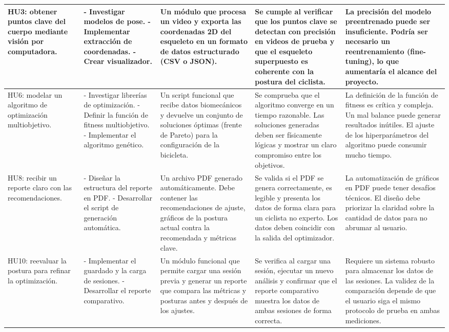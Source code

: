 \documentclass[
11pt, %
]{charter}
\begin{document}
\begin{xltabular}{\linewidth}{| X | X | X | X | X |}
HU3: obtener puntos clave del cuerpo mediante visión por computadora.
 & - Investigar modelos de pose. \newline - Implementar extracción de coordenadas. \newline - Crear visualizador.
 & Un módulo que procesa un video y exporta las coordenadas 2D del esqueleto en un formato de datos estructurado (CSV o JSON).
 & Se cumple al verificar que los puntos clave se detectan con precisión en videos de prueba y que el esqueleto superpuesto es coherente con la postura del ciclista.
 & La precisión del modelo preentrenado puede ser insuficiente. Podría ser necesario un reentrenamiento (fine-tuning), lo que aumentaría el alcance del proyecto. \\
\hline
HU6: modelar un algoritmo de optimización multiobjetivo.
 & - Investigar librerías de optimización. \newline - Definir la función de fitness multiobjetivo. \newline - Implementar el algoritmo genético.
 & Un script funcional que recibe datos biomecánicos y devuelve un conjunto de soluciones óptimas (frente de Pareto) para la configuración de la bicicleta.
 & Se comprueba que el algoritmo converge en un tiempo razonable. Las soluciones generadas deben ser físicamente lógicas y mostrar un claro compromiso entre los objetivos.
 & La definición de la función de fitness es crítica y compleja. Un mal balance puede generar resultados inútiles. El ajuste de los hiperparámetros del algoritmo puede consumir mucho tiempo. \\
\hline
HU8: recibir un reporte claro con las recomendaciones.
 & - Diseñar la estructura del reporte en PDF. \newline - Desarrollar el script de generación automática.
 & Un archivo PDF generado automáticamente. Debe contener las recomendaciones de ajuste, gráficos de la postura actual contra la recomendada y métricas clave.
 & Se valida si el PDF se genera correctamente, es legible y presenta los datos de forma clara para un ciclista no experto. Los datos deben coincidir con la salida del optimizador.
 & La automatización de gráficos en PDF puede tener desafíos técnicos. El diseño debe priorizar la claridad sobre la cantidad de datos para no abrumar al usuario. \\
\hline
HU10: reevaluar la postura para refinar la optimización.
 & - Implementar el guardado y la carga de sesiones. \newline - Desarrollar el reporte comparativo.
 & Un módulo funcional que permite cargar una sesión previa y generar un reporte que compara las métricas y posturas antes y después de los ajustes.
 & Se verifica al cargar una sesión, ejecutar un nuevo análisis y confirmar que el reporte comparativo muestra los datos de ambas sesiones de forma correcta.
 & Requiere un sistema robusto para almacenar los datos de las sesiones. La validez de la comparación depende de que el usuario siga el mismo protocolo de prueba en ambas mediciones. \\

\end{xltabular}
\end{document}
